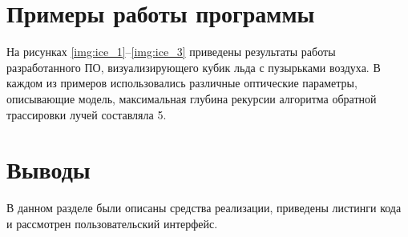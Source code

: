 
\section{Примеры работы программы}

На рисунках \ref{img:ice_1}--\ref{img:ice_3} приведены результаты работы разработанного ПО, визуализирующего кубик льда с пузырьками воздуха. В каждом из примеров использовались различные оптические параметры, описывающие модель, максимальная глубина рекурсии алгоритма обратной трассировки лучей составляла 5.


\clearpage




\section{Выводы}

В данном разделе были описаны средства реализации, приведены листинги кода и рассмотрен пользовательский интерфейс.
